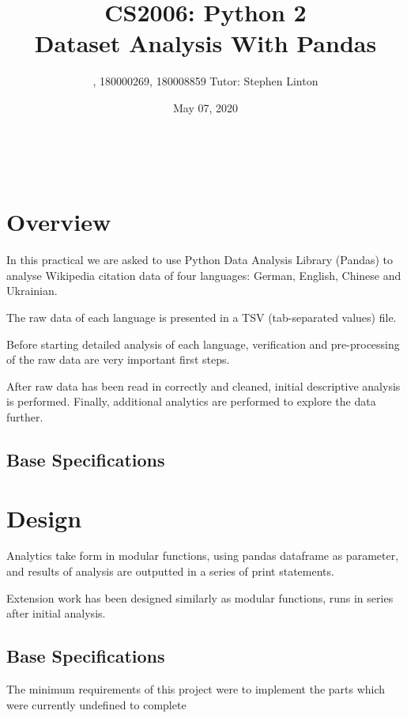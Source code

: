 \documentclass[12pt,a4paper,final]{article}
\begin{document}
\title{%
    CS2006: Python 2 \\
    \Large Dataset Analysis With Pandas} \\
\author{, 180000269, 180008859 Tutor: Stephen Linton}
\date{May 07, 2020}
\maketitle

\section*{Overview}
In this practical we are asked to use Python Data Analysis Library (Pandas) to analyse Wikipedia citation data of four languages: German, English, Chinese and Ukrainian.

The raw data of each language is presented in a TSV (tab-separated values) file.

Before starting detailed analysis of each language, verification and pre-processing of the raw data are very important first steps.

After raw data has been read in correctly and cleaned, initial descriptive analysis is performed. Finally, additional analytics are performed to explore the data further.




\subsection*{Base Specifications}

\begin{itemize}[noitemsep]

\end{itemize}

\section*{Design}
Analytics take form in modular functions, using pandas dataframe as parameter, and results of analysis are outputted in a series of print statements.

Extension work has been designed similarly as modular functions, runs in series after initial analysis.

\subsection*{Base Specifications}

The minimum requirements of this project were to implement the parts which were currently undefined
to complete
\end{document}
